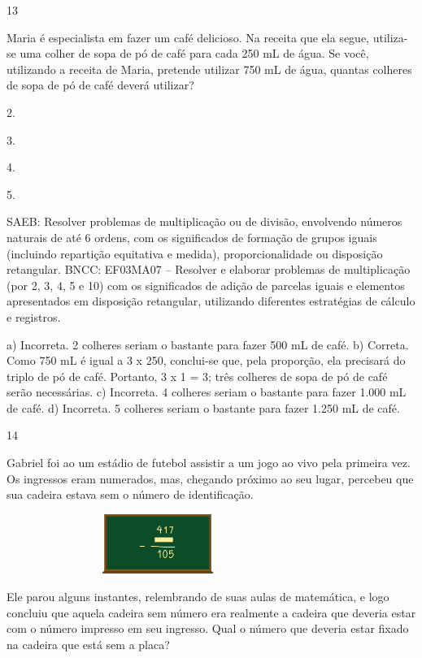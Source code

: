 {\begin{escolha}
{\num{13}

Maria é especialista em fazer um café delicioso. Na receita que ela segue, utiliza-se uma colher de sopa de pó de café para cada 250 mL de água. Se você, utilizando a receita de Maria, pretende utilizar 750 mL de água, quantas colheres de sopa de pó de café deverá utilizar?

\begin{escolha}
\item
  2.
\item
  3.
\item
  4.
\item
  5.
\end{escolha}

SAEB: Resolver problemas de multiplicação ou de divisão, envolvendo números naturais de até 6 ordens, com os significados de formação de grupos iguais (incluindo repartição equitativa e medida), proporcionalidade ou disposição retangular.
BNCC: EF03MA07 – Resolver e elaborar problemas de multiplicação (por 2, 3, 4, 5 e 10) com os
significados de adição de parcelas iguais e elementos apresentados em disposição retangular,
utilizando diferentes estratégias de cálculo e registros.

a) Incorreta. 2 colheres seriam o bastante para fazer 500 mL de café.
b) Correta. Como 750 mL é igual a 3 x 250, conclui-se que, pela proporção, ela
precisará do triplo de pó de café. Portanto, 3 x 1 = 3; três colheres de sopa de pó de café serão necessárias.
c) Incorreta. 4 colheres seriam o bastante para fazer 1.000 mL de café.
d) Incorreta. 5 colheres seriam o bastante para fazer 1.250 mL de café.

\num{14}

Gabriel foi ao um estádio de futebol assistir a um jogo ao vivo pela primeira vez. Os ingressos eram numerados, mas, chegando próximo ao seu
lugar, percebeu que sua cadeira estava sem o número de identificação.


\includegraphics[width=3.87534in,height=0.76673in]{media/image122.png}

Ele parou alguns instantes, relembrando de suas aulas de matemática, e logo concluiu que aquela cadeira sem número era realmente a cadeira que deveria estar com o número impresso em seu ingresso. Qual o número que
deveria estar fixado na cadeira que está sem a placa?

}
\end{escolha}}
